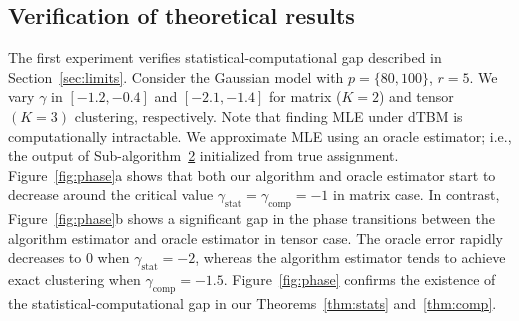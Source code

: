 \documentclass[lettersize,journal]{IEEEtran}
\theoremstyle{definition}
\theoremstyle{definition}
\begin{document}
 


\subsection{Verification of theoretical results}

The first experiment verifies  statistical-computational gap described in Section~\ref{sec:limits}. Consider the Gaussian model with $p = \{80, 100\}$, $r = 5$. We vary $\gamma $ in $ [-1.2, -0.4]$ and $[-2.1, -1.4]$ for matrix ($K=2$) and tensor $(K = 3)$ clustering, respectively. Note that finding MLE under dTBM is computationally intractable. We approximate MLE using an oracle estimator; i.e., the output of Sub-algorithm~\hyperref[alg:main]{2} initialized from true assignment. Figure~\ref{fig:phase}a shows that both our algorithm and oracle estimator start to decrease around the critical value $\gamma_{\text{stat}}  = \gamma_{\text{comp}}  = -1$ in matrix case. In contrast, Figure~\ref{fig:phase}b shows a significant gap in the phase transitions between the algorithm estimator and oracle estimator in tensor case. The oracle error rapidly decreases to 0 when $\gamma_{\text{stat}} = -2$, whereas the algorithm estimator tends to achieve exact clustering when $\gamma_{\text{comp}} = -1.5$. Figure~\ref{fig:phase} confirms the existence of the statistical-computational gap in our Theorems~\ref{thm:stats} and~\ref{thm:comp}. 
\end{document}
